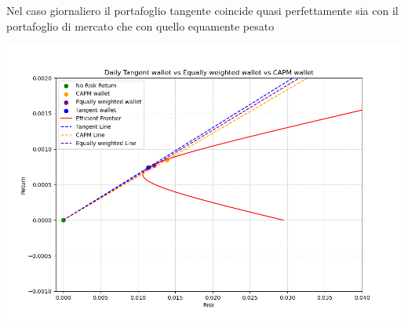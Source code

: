\documentclass[compress]{beamer}
\begin{document}
\begin{frame}{\subsecname}
	Nel caso giornaliero il portafoglio tangente coincide quasi perfettamente sia con il portafoglio di mercato che con quello equamente pesato
	\begin{center}
		\begin{minipage}{0.8\textwidth}
			\centering
			\includegraphics[width=1\linewidth]{images/Daily Tangent wallet vs Equally weighted wallet vs CAPM wallet.png}
		\end{minipage}
	\end{center}
\end{frame}
\end{document}
